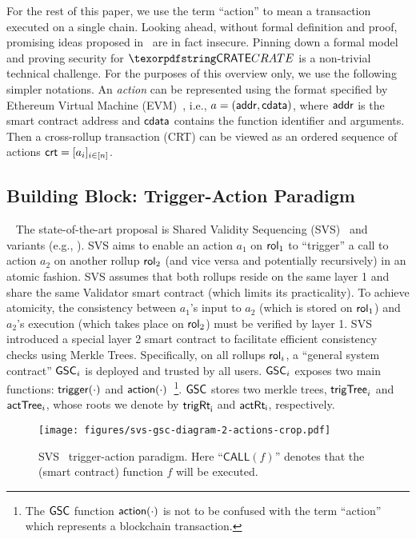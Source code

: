 For the rest of this paper, we use the term ``action'' to mean a transaction executed on a single chain. Looking ahead, without formal definition and proof, promising ideas proposed in~\cite{shared-val-seq-23} are in fact insecure. 
Pinning down a formal model and proving security for $\pname$ is a non-trivial technical challenge. 
For the purposes of this overview only, we use the following simpler notations. An \emph{action} can be represented using the format specified by Ethereum Virtual Machine (EVM)~\cite{eth-evm}, i.e., 
$a = (\mathsf{addr}, \mathsf{cdata})$, where $\mathsf{addr}$ is the smart contract address and $\mathsf{cdata}$ contains the function identifier and arguments.
Then a cross-rollup transaction (CRT) can be viewed as an ordered sequence of actions $ \mathsf{crt} = [a_i]_{i \in [n]}$.






\subsection{Building Block: Trigger-Action Paradigm}~\label{sec:overview-svs}
The state-of-the-art proposal is Shared Validity Sequencing (SVS)~\cite{shared-val-seq-23} and variants (e.g., \cite{espresso-circ-24}).
SVS aims to enable an action $a_1$ on $\mathsf{rol}_{1}$ to ``trigger'' a call to action $a_2$ on another rollup $\mathsf{rol}_{2}$ (and vice versa and potentially recursively) in an atomic fashion.
SVS assumes that both rollups reside on the same layer 1 and share the same Validator smart contract (which limits its practicality).
To achieve atomicity, the consistency between $a_1$'s input to $a_2$ (which is stored on $\mathsf{rol}_{1}$) and $a_2$'s execution (which takes place on $\mathsf{rol}_{2}$) must be verified by layer 1. SVS introduced a special layer 2 smart contract to facilitate efficient consistency checks using Merkle Trees.
Specifically, on all rollups $\mathsf{rol}_{i}$, a ``general system contract'' $\mathsf{GSC}_i$ is deployed and trusted by all users. $\mathsf{GSC}_i$ exposes two main functions: $\mathsf{trigger}(\cdot)$ and $\mathsf{action}(\cdot)$~\footnote{The $\mathsf{GSC}$ function $\mathsf{action}(\cdot)$ is not to be confused with the term ``action'' which represents a blockchain transaction.}. $\mathsf{GSC}$ stores two merkle trees, $\mathsf{trigTree}_i$ and $\mathsf{actTree}_i$, whose roots we denote by $\mathsf{trigRt}_{\mathsf{i}}$ and $\mathsf{actRt}_{\mathsf{i}}$, respectively.

\begin{figure}
    \centering
    \texttt{[image: figures/svs-gsc-diagram-2-actions-crop.pdf]}
    \caption{SVS~\cite{shared-val-seq-23} trigger-action paradigm. Here ``$\mathsf{CALL}(f)$'' denotes that the (smart contract) function $f$ will be executed.}
    \label{fig:orig-svs-trigger-action}
\end{figure}

